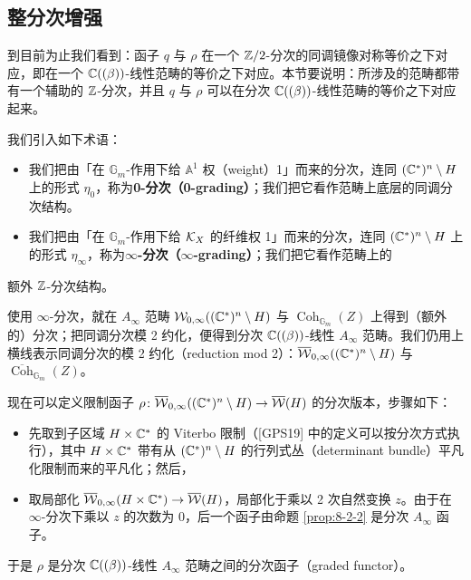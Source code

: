 \subsection{整分次增强}

到目前为止我们看到：函子 $q$ 与 $\rho$ 在一个 $\mathbb{Z}/2$-分次的同调镜像对称等价之下对应，即在一个 $\mathbb{C}((\beta))$-线性范畴的等价之下对应。本节要说明：所涉及的范畴都带有一个辅助的 $\mathbb{Z}$-分次，并且 $q$ 与 $\rho$ 可以在分次 $\mathbb{C}((\beta))$-线性范畴的等价之下对应起来。

\begin{definition}\label{def:8-3-1}
我们引入如下术语：
\begin{itemize}
\item 我们把由「在 $\mathbb G_m$-作用下给 $\mathbb A^1$ 权（weight）1」而来的分次，连同 $(\mathbb{C}^*)^n\setminus H$ 上的形式 $\eta_0$，称为\textbf{0-分次（0-grading）}；我们把它看作范畴上底层的同调分次结构。
\item 我们把由「在 $\mathbb G_m$-作用下给 $\mathcal{K}_X$ 的纤维权 1」而来的分次，连同 $(\mathbb{C}^*)^n\setminus H$ 上的形式 $\eta_\infty$，称为\textbf{$\infty$-分次（$\infty$-grading）}；我们把它看作范畴上的
\end{itemize}
\end{definition}

额外 $\mathbb{Z}$-分次结构。

使用 $\infty$-分次，就在 $A_\infty$ 范畴 $\mathcal{W}_{0,\infty}((\mathbb{C}^*)^n\setminus H)$ 与 $\operatorname{Coh}_{\mathbb G_m}(Z)$ 上得到（额外的）分次；把同调分次模 2 约化，便得到分次 $\mathbb{C}((\beta))$-线性 $A_\infty$ 范畴。我们仍用上横线表示同调分次的模 2 约化（reduction mod 2）：$\overline{\mathcal{W}}_{0,\infty}((\mathbb{C}^*)^n\setminus H)$ 与 $\overline{\operatorname{Coh}}_{\mathbb G_m}(Z)$。

现在可以定义限制函子 $\rho\colon\overline{\mathcal{W}}_{0,\infty}((\mathbb{C}^*)^n\setminus H)\to\overline{\mathcal{W}}(H)$ 的分次版本，步骤如下：
\begin{itemize}
\item 先取到子区域 $H\times\mathbb{C}^*$ 的 Viterbo 限制（[GPS19] 中的定义可以按分次方式执行），其中 $H\times\mathbb{C}^*$ 带有从 $(\mathbb{C}^*)^n\setminus H$ 的行列式丛（determinant bundle）平凡化限制而来的平凡化；然后，
\item 取局部化 $\overline{\mathcal{W}}_{0,\infty}(H\times\mathbb{C}^*)\to\overline{\mathcal{W}}(H)$，局部化于乘以 2 次自然变换 $z$。由于在 $\infty$-分次下乘以 $z$ 的次数为 0，后一个函子由命题 \ref{prop:8-2-2} 是分次 $A_\infty$ 函子。
\end{itemize}
于是 $\rho$ 是分次 $\mathbb{C}((\beta))$-线性 $A_\infty$ 范畴之间的分次函子（graded functor）。

